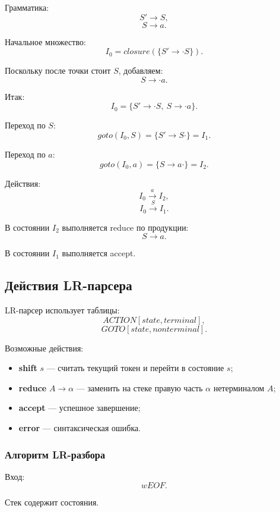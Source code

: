 \documentclass[12pt,a4paper]{article}
\theoremstyle{definition}
\theoremstyle{plain}
\begin{document}
Грамматика:
\[
S'\to S,
\]
\[
S\to a.
\]

Начальное множество:
\[
I_0=closure(\{S'\to \cdot S\}).
\]

Поскольку после точки стоит $S$, добавляем:
\[
S\to \cdot a.
\]

Итак:
\[
I_0=
\{
S'\to \cdot S,\
S\to \cdot a
\}.
\]

Переход по $S$:
\[
goto(I_0,S)=\{S'\to S\cdot\}=I_1.
\]

Переход по $a$:
\[
goto(I_0,a)=\{S\to a\cdot\}=I_2.
\]

Действия:
\[
I_0 \xrightarrow{a} I_2,
\]
\[
I_0 \xrightarrow{S} I_1.
\]

В состоянии $I_2$ выполняется reduce по продукции:
\[
S\to a.
\]

В состоянии $I_1$ выполняется accept.

\subsection{Действия LR-парсера}

LR-парсер использует таблицы:
\[
ACTION[state, terminal],
\]
\[
GOTO[state, nonterminal].
\]

Возможные действия:

\begin{itemize}
    \item \textbf{shift} $s$ --- считать текущий токен и перейти в состояние $s$;
    \item \textbf{reduce} $A\to\alpha$ --- заменить на стеке правую часть $\alpha$ нетерминалом $A$;
    \item \textbf{accept} --- успешное завершение;
    \item \textbf{error} --- синтаксическая ошибка.
\end{itemize}

\subsubsection*{Алгоритм LR-разбора}

Вход:
\[
wEOF.
\]

Стек содержит состояния.
\end{document}
